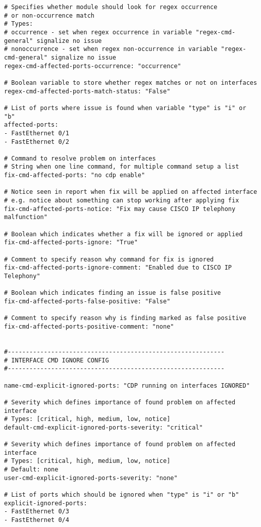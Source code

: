 \begin{lstlisting}
# Specifies whether module should look for regex occurrence
# or non-occurrence match
# Types:
# occurrence - set when regex occurrence in variable "regex-cmd-general" signalize no issue
# nonoccurrence - set when regex non-occurrence in variable "regex-cmd-general" signalize no issue
regex-cmd-affected-ports-occurrence: "occurrence"

# Boolean variable to store whether regex matches or not on interfaces 
regex-cmd-affected-ports-match-status: "False"

# List of ports where issue is found when variable "type" is "i" or "b"
affected-ports:
- FastEthernet 0/1
- FastEthernet 0/2

# Command to resolve problem on interfaces
# String when one line command, for multiple command setup a list
fix-cmd-affected-ports: "no cdp enable"

# Notice seen in report when fix will be applied on affected interface
# e.g. notice about something can stop working after applying fix
fix-cmd-affected-ports-notice: "Fix may cause CISCO IP telephony malfunction"

# Boolean which indicates whether a fix will be ignored or applied
fix-cmd-affected-ports-ignore: "True"

# Comment to specify reason why command for fix is ignored
fix-cmd-affected-ports-ignore-comment: "Enabled due to CISCO IP Telephony"

# Boolean which indicates finding an issue is false positive
fix-cmd-affected-ports-false-positive: "False"

# Comment to specify reason why is finding marked as false positive
fix-cmd-affected-ports-positive-comment: "none"


#------------------------------------------------------------
# INTERFACE CMD IGNORE CONFIG
#------------------------------------------------------------

name-cmd-explicit-ignored-ports: "CDP running on interfaces IGNORED"

# Severity which defines importance of found problem on affected interface
# Types: [critical, high, medium, low, notice]
default-cmd-explicit-ignored-ports-severity: "critical"

# Severity which defines importance of found problem on affected interface
# Types: [critical, high, medium, low, notice]
# Default: none
user-cmd-explicit-ignored-ports-severity: "none"

# List of ports which should be ignored when "type" is "i" or "b"
explicit-ignored-ports:
- FastEthernet 0/3
- FastEthernet 0/4


\end{lstlisting}
